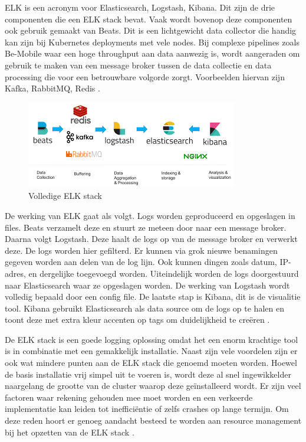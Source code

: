 ELK is een acronym voor Elasticsearch, Logstash, Kibana. Dit zijn de drie componenten die een ELK stack bevat. Vaak wordt bovenop deze componenten ook gebruik gemaakt van Beats. Dit is een lichtgewicht data collector die handig kan zijn bij Kubernetes deployments met vele nodes. Bij complexe pipelines zoals Be-Mobile waar een hoge throughput aan data aanwezig is, wordt aangeraden om gebruik te maken van een message broker tussen de data collectie en data processing die voor een betrouwbare volgorde zorgt. Voorbeelden hiervan zijn Kafka, RabbitMQ, Redis \autocite{berman2018-12}. 

\begin{figure}[ht]
    \centering
    \includegraphics[scale=1]{img/elk-proces}
    \caption[Volledige ELK stack]{Volledige ELK stack \cite{berman2018-12}}
\end{figure}

De werking van ELK gaat als volgt. Logs worden geproduceerd en opgeslagen in files. Beats verzamelt deze en stuurt ze meteen door naar een message broker. Daarna volgt Logstash. Deze haalt de logs op van de message broker en verwerkt deze. De logs worden hier gefilterd. Er kunnen via grok nieuwe benamingen gegeven worden aan delen van de log lijn. Ook kunnen dingen zoals datum, IP-adres, en dergelijke toegevoegd worden. Uiteindelijk worden de logs doorgestuurd naar Elasticsearch waar ze opgeslagen worden. De werking van Logstash wordt volledig bepaald door een config file. De laatste stap is Kibana, dit is de visualitie tool. Kibana gebruikt Elasticsearch als data source om de logs op te halen en toont deze met extra kleur accenten op tags om duidelijkheid te creëren \cite{levy2015,berman2018-12}. 

De ELK stack is een goede logging oplossing omdat het een enorm krachtige tool is in combinatie met een gemakkelijk installatie. Naast zijn vele voordelen zijn er ook wat mindere punten aan de ELK stack die genoemd moeten worden. Hoewel de basis installatie vrij simpel uit te voeren is, wordt deze al snel ingewikkelder naargelang de grootte van de cluster waarop deze geïnstalleerd wordt. Er zijn veel factoren waar rekening gehouden mee moet worden en een verkeerde implementatie kan leiden tot inefficiëntie of zelfs crashes op lange termijn. Om deze reden hoort er genoeg aandacht besteed te worden aan resource management bij het opzetten van de ELK stack \autocite{gifford2016}.

